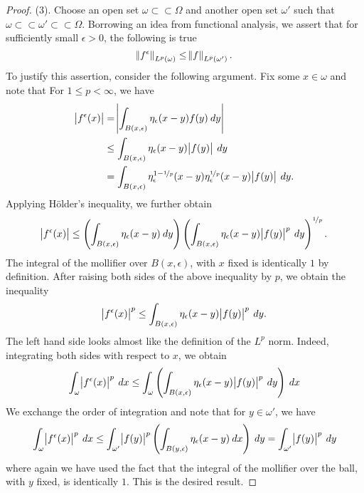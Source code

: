 \documentclass[10pt]{article}
\begin{document}
\begin{proof}
	(3). Choose an open set $\omega \subset \subset \Omega$ and another open set $\omega'$ such that $\omega \subset \subset \omega' \subset \subset \Omega$. Borrowing an idea from functional analysis, we assert that for sufficiently small $\epsilon > 0$, the following is true 
	\begin{equation*}
		\displaystyle \norm{f^\epsilon}_{L^p(\omega)} \leq \norm{f}_{L^p(\omega')}.
	\end{equation*}  
	To justify this assertion, consider the following argument. Fix some $x \in \omega$ and note that For $1 \leq p < \infty$, we have 
	\begin{align*}
		\displaystyle \abs{f^\epsilon(x)} &= \abs{\int_{B(x,\epsilon)}{\eta_{\epsilon}(x-y) f(y) \: dy}} \\ 
		&\leq \int_{B(x,\epsilon)}{\eta_\epsilon(x-y)\abs{f(y)} \: dy} \\
		&= \int_{B(x,\epsilon)}{\eta^{1 - \nicefrac{1}{p}}_\epsilon(x-y)\eta^{\nicefrac{1}{p}}_\epsilon(x-y)\abs{f(y)} \: dy}.
	\end{align*}
	Applying H\"older's inequality, we further obtain 
	\begin{equation*}
		\displaystyle \abs{f^\epsilon(x)} \leq \left( \int_{B(x,\epsilon)}{\eta_\epsilon(x-y) \: dy} \right)\left( \int_{B(x,\epsilon)}{\eta_\epsilon(x-y)\abs{f(y)}^p \: dy} \right)^{\nicefrac{1}{p}}.
	\end{equation*}
	The integral of the mollifier over $B(x,\epsilon)$, with $x$ fixed is identically $1$ by definition. After raising both sides of the above inequality by $p$, we obtain the inequality 
	\begin{equation*}
		\displaystyle \abs{f^\epsilon(x)}^p \leq \int_{B(x,\epsilon)}{\eta_\epsilon(x-y)\abs{f(y)}^p \: dy}.
	\end{equation*}
	The left hand side looks almost like the definition of the $L^p$ norm. Indeed, integrating both sides with respect to $x$, we obtain 
	\begin{align*}
		\displaystyle \int_{\omega}{\abs{f^\epsilon(x)}^p \: dx} \leq \int_{\omega}{\left( \int_{B(x,\epsilon)}{\eta_\epsilon(x-y) \abs{f(y)}^p \: dy} \right) \: dx}
	\end{align*}
	We exchange the order of integration and note that for $y \in \omega'$, we have
	\begin{equation*}
		\displaystyle \int_{\omega}{\abs{f^\epsilon(x)}^p \: dx} \leq \int_{\omega'}{\abs{f(y)}^p \left( \int_{B(y,\epsilon)}{\eta_\epsilon(x-y) \: dx}\right) \: dy} = \int_{\omega'}{\abs{f(y)}^p \: dy}
	\end{equation*}
	where again we have used the fact that the integral of the mollifier over the ball, with $y$ fixed, is identically $1$. This is the desired result. 
	

\end{proof}
\end{document}
